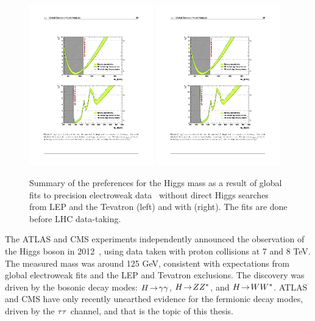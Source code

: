 \begin{figure}[tp]
  \centering
  \includegraphics[width=0.48\textwidth]{figures/standardmodel/gfitter_standardfit}
  \includegraphics[width=0.48\textwidth]{figures/standardmodel/gfitter_completefit}
  \caption{Summary of the preferences for the Higgs mass as a result of global fits to precision electroweak data~\cite{2009.gfitter} without direct Higgs searches from LEP and the Tevatron (left) and with (right). The fits are done before LHC data-taking.}
  \label{fig:sm-gfitter}
\end{figure}

The ATLAS and CMS experiments independently announced the observation of the Higgs boson in 2012~\cite{HIGG-2012-27,2012.cms-higgs}, using data taken with proton collisions at 7 and 8 TeV. The measured mass was around 125 GeV, consistent with expectations from global electroweak fits and the LEP and Tevatron exclusions. The discovery was driven by the bosonic decay modes: $H \!\rightarrow\! \gamma\gamma$, $H \!\rightarrow\! ZZ^\ast$, and $H \!\rightarrow\! WW^\ast$. ATLAS and CMS have only recently unearthed evidence for the fermionic decay modes, driven by the $\tau\tau$ channel, and that is the topic of this thesis.

